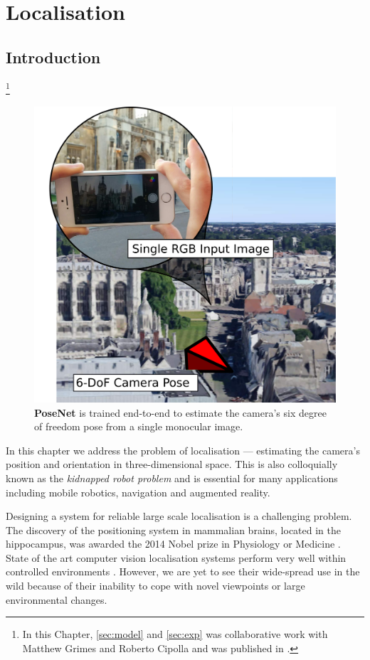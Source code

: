 \chapter{Localisation}
\label{localisation}

\graphicspath{{Chapter3/Figs/}}

\section{Introduction}

{\let\thefootnote\relax\footnote{{In this Chapter, \cref{sec:model} and \cref{sec:exp} was collaborative work with Matthew Grimes and Roberto Cipolla and was published in \citep{kendall2015posenet}.}}}

\begin{figure}[t]
	\begin{center}
		\includegraphics[width=0.5\linewidth]{teaser.pdf}
	\end{center}
	\caption[PoseNet: Convolutional networks for 6-DOF camera pose regression]{\textbf{PoseNet} \citep{kendall2015posenet} is trained end-to-end to estimate the camera's six degree of freedom pose from a single monocular image.}
	\label{teaser}
\end{figure}

In this chapter we address the problem of localisation --- estimating the camera's position and orientation in three-dimensional space. This is also colloquially known as the \textit{kidnapped robot problem} and is essential for many applications including mobile robotics, navigation and augmented reality. 

Designing a system for reliable large scale localisation is a challenging problem. The discovery of the positioning system in mammalian brains, located in the hippocampus, was awarded the 2014 Nobel prize in Physiology or Medicine \citep{o1978hippocampus,moser2008place}. State of the art computer vision localisation systems perform very well within controlled environments \citep{klein2007parallel,newcombe2011dtam,engel2014lsd,mur2015orb,Sattler14ECCV}. However, we are yet to see their wide-spread use in the wild because of their inability to cope with novel viewpoints or large environmental changes.

